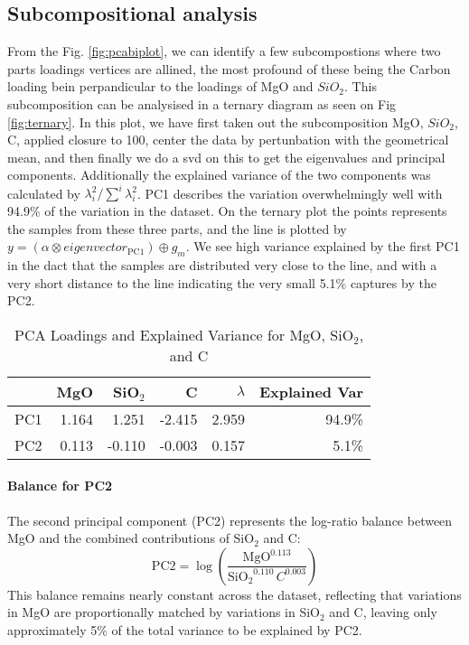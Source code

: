 
\subsection{Subcompositional analysis }

From the Fig. \ref{fig:pcabiplot}, we can identify a few subcompostions where two parts loadings vertices 
are allined, the most profound of these being the Carbon loading bein perpandicular to the loadings of MgO and $SiO_2$. This subcomposition can be analysised in a ternary diagram as seen on Fig \ref{fig:ternary}. In this plot, we have first taken out the subcomposition MgO, $SiO_2$, C, applied closure to 100, center the data by pertunbation with the geometrical mean, and then finally we do a svd on this to get the eigenvalues and principal components. Additionally the explained variance of the two components was calculated by $\lambda_{i}^{2} / \sum^{i} \lambda_{i}^{2}$. PC1 describes the variation overwhelmingly well with 94.9\% of the variation in the dataset. On the ternary plot the points represents the samples from these three parts, and the line is plotted by $y = (\alpha \otimes eigenvector_{\mathrm{PC1}}) \oplus g_m$. We see high variance explained by the first PC1 in the dact that the samples are distributed very close to the line, and with a very short distance to the line indicating the very small 5.1\% captures by the PC2. 

\begin{table}[h!]
\centering
\begin{tabular}{lrrrrr}
\hline
      & MgO      & SiO$_2$   & C         & $\lambda$   & Explained Var \\
\hline
PC1   & 1.164    & 1.251     & -2.415    & 2.959       & 94.9\% \\
PC2   & 0.113    & -0.110    & -0.003    & 0.157       & 5.1\% \\
\hline
\end{tabular}
\caption{PCA Loadings and Explained Variance for MgO, SiO$_2$, and C}
\label{tab:pca_loadings}
\end{table}

\paragraph{Balance for PC2}  
The second principal component (PC2) represents the log-ratio balance between MgO and the combined contributions of SiO$_2$ and C:
\[
\mathrm{PC2} = \log\left( \frac{\mathrm{MgO}^{0.113}}{\mathrm{SiO_2}^{0.110} \, C^{0.003}} \right)
\]
This balance remains nearly constant across the dataset, reflecting that variations in MgO are proportionally matched by variations in SiO$_2$ and C, leaving only approximately 5\% of the total variance to be explained by PC2. 




